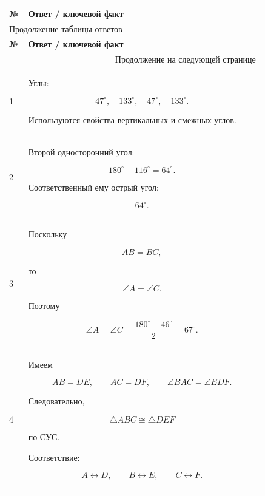 \documentclass[a4paper,12pt]{article}
\begin{document}
\begin{longtable}
{@{}
p{0.07\linewidth}
p{0.86\linewidth}
@{}}

\toprule

\textbf{№}
&
\textbf{Ответ / ключевой факт}
\\

\midrule
\endfirsthead

\multicolumn{2}{l}{
\small\textcolor{softgray}{Продолжение таблицы ответов}
}
\\[2mm]

\toprule

\textbf{№}
&
\textbf{Ответ / ключевой факт}
\\

\midrule
\endhead

\midrule
\multicolumn{2}{r}{
\small\textcolor{softgray}{Продолжение на следующей странице}
}
\\
\endfoot

\bottomrule
\endlastfoot

1
&
Углы:

\[
47^\circ,\quad
133^\circ,\quad
47^\circ,\quad
133^\circ.
\]

Используются свойства вертикальных
и смежных углов.
\\[2mm]

2
&
Второй односторонний угол:

\[
180^\circ-116^\circ=64^\circ.
\]

Соответственный ему острый угол:

\[
64^\circ.
\]
\\[2mm]

3
&
Поскольку

\[
AB=BC,
\]

то

\[
\angle A=\angle C.
\]

Поэтому

\[
\angle A
=
\angle C
=
\frac{180^\circ-46^\circ}{2}
=
67^\circ.
\]
\\[2mm]

4
&
Имеем

\[
AB=DE,
\qquad
AC=DF,
\qquad
\angle BAC=\angle EDF.
\]

Следовательно,

\[
\triangle ABC\cong\triangle DEF
\]

по СУС.

Соответствие:

\[
A\leftrightarrow D,
\qquad
B\leftrightarrow E,
\qquad
C\leftrightarrow F.
\]
\\[2mm]


\end{longtable}
\end{document}
